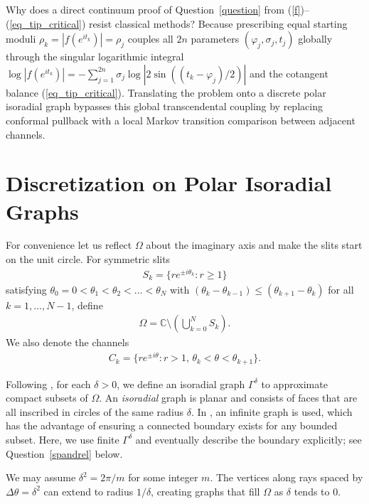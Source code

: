 \documentclass[11pt,reqno]{amsart}
\numberwithin{equation}{section}
\renewcommand{\phi}{\varphi}
\newcommand{\C}{\mathbb{C}}
\begin{document}
Why does a direct continuum proof of Question~\ref{question} from (\ref{f})--(\ref{eq_tip_critical}) resist classical methods? Because prescribing equal starting moduli $\rho_k = |f(e^{it_k})| = \rho_j$ couples all $2n$ parameters $(\phi_j, \sigma_j, t_j)$ globally through the singular logarithmic integral $\log|f(e^{it_k})| = -\sum_{j=1}^{2n} \sigma_j \log|2\sin((t_k-\phi_j)/2)|$ and the cotangent balance (\ref{eq_tip_critical}). Translating the problem onto a discrete polar isoradial graph bypasses this global transcendental coupling by replacing conformal pullback with a local Markov transition comparison between adjacent channels.

\section{Discretization on Polar Isoradial Graphs}

For convenience let us reflect $\varOmega$ about the imaginary axis and make the slits start on the unit circle.
For symmetric slits
\begin{align}
S_k = \{ re^{\pm i \theta_k} :  r \ge 1\}
\end{align}
satisfying $\theta_0 = 0 < \theta_1 < \theta_2 < \dots < \theta_N$ with $(\theta_k - \theta_{k-1}) \leq (\theta_{k+1} - \theta_k)$ for all $k = 1, \dots, N-1$, define
\begin{align}
\varOmega = \C \setminus \left( \bigcup_{k=0}^N S_k \right).
\end{align}
We also denote the channels
\begin{align}
C_k = \{ re^{\pm i \theta} :  r > 1,\, \theta_k < \theta < \theta_{k+1}\}.
\end{align}

Following \cite{CS}, for each $\delta > 0$, we define an isoradial graph $\varGamma^{\delta}$ to approximate compact subsets of $\varOmega$. An \textit{isoradial} graph is planar and consists of faces that are all inscribed in circles of the same radius $\delta$. In \cite{CS}, an infinite graph is used, which has the advantage of ensuring a connected boundary exists for any bounded subset. Here, we use finite $\varGamma^{\delta}$ and eventually describe the boundary explicitly; see Question~\ref{spandrel} below.

We may assume $\delta^2 = 2\pi/ m$ for some integer $m$.
The vertices along rays spaced by $\Delta \theta = \delta^2$ can extend to radius $1/\delta$, creating graphs that fill $\varOmega$ as $\delta$ tends to $0$.
\end{document}
